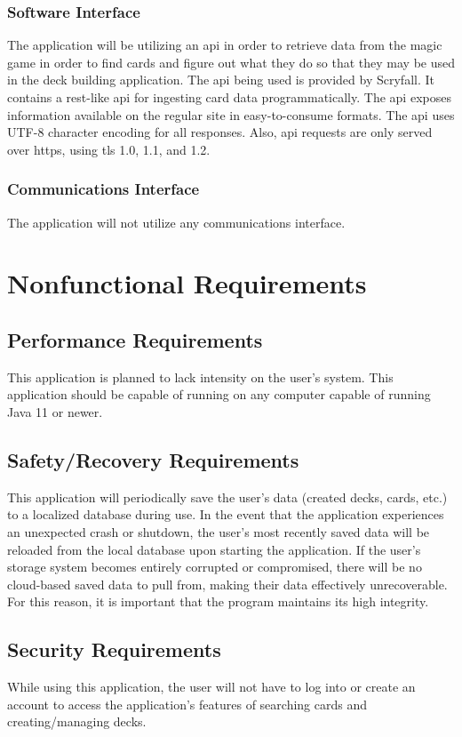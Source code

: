 \documentclass[12pt]{report}
\newcommand{\javaversion}{11 }
\begin{document}
\subsection{Software Interface}
The application will be utilizing an \acrshort{api} in order to retrieve data from the \gls{magic} game in order to find cards and figure out what they do so that they may be used in the deck building application. The \acrshort{api} being used is provided by Scryfall. It contains a \gls{rest}-like \acrshort{api} for ingesting card data programmatically. The \acrshort{api} exposes information available on the regular site in easy-to-consume formats. The \acrshort{api} uses UTF-8 character encoding for all responses. Also, \acrshort{api} requests are only served over \gls{https}, using \acrshort{tls} 1.0, 1.1, and 1.2.
\subsection{Communications Interface}
The application will not utilize any communications interface.
\chapter{Nonfunctional Requirements}
\section{Performance Requirements}
This application is planned to lack intensity on the user’s system. This application should be capable of running on any computer capable of running Java \javaversion or newer.
\section{Safety/Recovery Requirements}
This application will periodically save the user’s data (created decks, cards, etc.) 
to a localized database during use. In the event that the application 
experiences an unexpected crash or shutdown, the user’s most recently saved
data will be reloaded from the local database upon starting the application.
If the user’s storage system becomes entirely corrupted or compromised, there 
will be no cloud-based saved data to pull from, making their data effectively unrecoverable. For this reason, it is important that the program maintains its high integrity.
\section{Security Requirements}
While using this application, the user will not have to log into or create an 
account to access the application’s features of searching cards and creating/managing decks.
\end{document}
